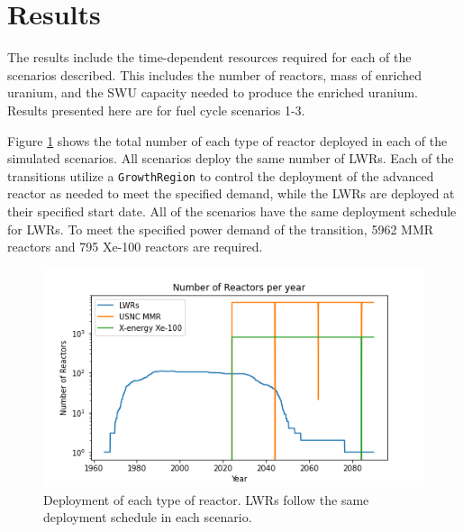 \section{Results}

The results include the time-dependent resources required 
for each of the scenarios described. This includes 
the number of reactors, mass of enriched uranium, and the 
\gls{SWU} capacity needed to produce the enriched uranium.
Results presented here are for fuel cycle scenarios 1-3.  

Figure \ref{fig:rx_deployment} shows the total number 
of each type of reactor deployed in each of the simulated 
scenarios. All scenarios deploy the same number of \gls{LWR}s. 
Each of the transitions utilize a \Cycamore \texttt{GrowthRegion} 
to control the deployment of the advanced reactor as needed 
to meet the specified demand, while the \gls{LWR}s are 
deployed at their specified start date. All of the scenarios 
have the same deployment schedule for \gls{LWR}s. To meet the
specified power demand of the transition, 5962 
\gls{MMR} reactors and 795 Xe-100 reactors are required.  


\begin{figure}[ht]
    \centering
    \includegraphics[scale=0.5]{figures/rx_deployment_all.png}
    \caption{Deployment of each type of reactor. \gls{LWR}s follow 
    the same deployment schedule in each scenario.}
    \label{fig:rx_deployment}
\end{figure}

